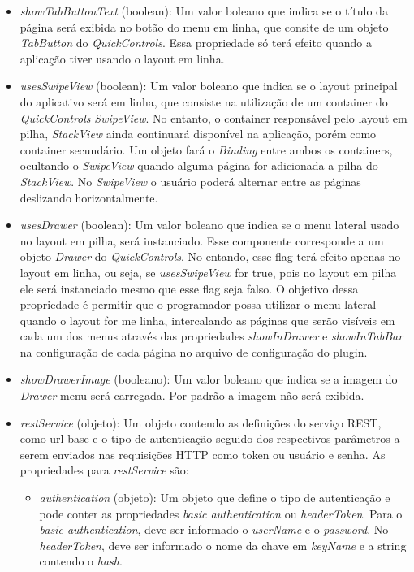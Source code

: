 \begin{itemize}
	\item \textit{showTabButtonText} (boolean): Um valor boleano que indica se o título da página será exibida no botão do menu em linha, que consite de um objeto \textit{TabButton} do \textit{QuickControls}. Essa propriedade só terá efeito quando a aplicação tiver usando o layout em linha.

	\item \textit{usesSwipeView} (boolean): Um valor boleano que indica se o layout principal do aplicativo será em linha, que consiste na utilização de um container do \textit{QuickControls} \textit{SwipeView}. No entanto, o container responsável pelo layout em pilha, \textit{StackView} ainda continuará disponível na aplicação, porém como container secundário. Um objeto fará o \textit{Binding} entre ambos os containers, ocultando o \textit{SwipeView} quando alguma página for adicionada a pilha do \textit{StackView}. No \textit{SwipeView} o usuário poderá alternar entre as páginas deslizando horizontalmente.

	\item \textit{usesDrawer} (boolean): Um valor boleano que indica se o menu lateral usado no layout em pilha, será instanciado. Esse componente corresponde a um objeto \textit{Drawer} do \textit{QuickControls}. No entando, esse flag terá efeito apenas no layout em linha, ou seja, se \textit{usesSwipeView} for true, pois no layout em pilha ele será instanciado mesmo que esse flag seja falso. O objetivo dessa propriedade é permitir que o programador possa utilizar o menu lateral quando o layout for me linha, intercalando as páginas que serão visíveis em cada um dos menus através das propriedades \textit{showInDrawer} e \textit{showInTabBar} na configuração de cada página no arquivo de configuração do plugin.

	\item \textit{showDrawerImage} (booleano): Um valor boleano que indica se a imagem do \textit{Drawer} menu será carregada. Por padrão a imagem não será exibida.

	\item \textit{restService} (objeto): Um objeto contendo as definições do serviço REST, como url base e o tipo de autenticação seguido dos respectivos parâmetros a serem enviados nas requisições HTTP como token ou usuário e senha. As propriedades para \textit{restService} são: 

	\begin{itemize}
		\item \textit{authentication} (objeto): Um objeto que define o tipo de autenticação e pode conter as propriedades \textit{basic authentication} ou \textit{headerToken}. Para o \textit{basic authentication}, deve ser informado o \textit{userName} e o \textit{password}. No \textit{headerToken}, deve ser informado o nome da chave em \textit{keyName} e a string contendo o \textit{hash}.


\end{itemize}
\end{itemize}
